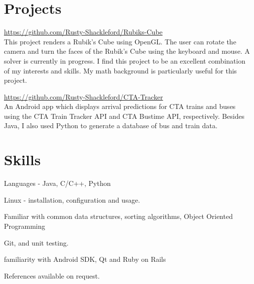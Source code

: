 \documentclass[letterpaper, 12pt, oneside]{memoir}
\begin{document}
\section*{Projects}
\begin{compactitem}
    \item \url{https://github.com/Rusty-Shackleford/Rubiks-Cube} \\
    This project renders a Rubik's Cube using OpenGL. The user can rotate the 
    camera and turn the faces of the Rubik's Cube using the keyboard and mouse. 
    A solver is currently in progress. I find this project to be an excellent 
    combination of my interests and skills. My math background is particularly 
    useful for this project.
    \vspace{1ex}

    \item \url{https://github.com/Rusty-Shackleford/CTA-Tracker} \\
    An Android app which displays arrival predictions for CTA trains and buses 
    using the CTA Train Tracker API and CTA Bustime API, respectively. Besides 
    Java, I also used Python to generate a database of bus and train data.
\end{compactitem}


\section*{Skills}
\begin{compactitem}
    \item Languages - Java, C/C++, Python
    \item Linux - installation, configuration and usage.
    \item Familiar with common data structures, sorting algorithms, Object Oriented Programming
    \item Git, and unit testing.
    \item familiarity with Android SDK, Qt and Ruby on Rails
\end{compactitem}

References available on request. 
\end{document}
